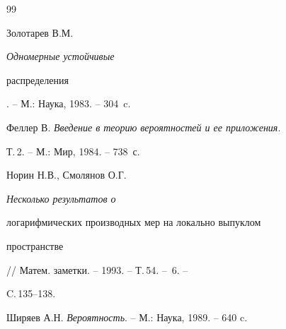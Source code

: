 \begin{thebibliography}{99}


Золотарев В.М. {\it Одномерные устойчивые 


распределения}. -- М.: Наука, 1983. -- 304~c.




Феллер В. {\it Введение в теорию вероятностей и ее приложения}.


Т.\,2. -- М.: Мир, 1984. -- 738~с.




Норин Н.В., Смолянов О.Г. {\it Несколько результатов о


логарифмических производных мер на локально выпуклом


пространстве} // Матем. заметки. -- 1993. -- Т.\,54. -- \No\,6. --


C.\,135--138.




Ширяев А.Н. {\it Вероятность}. -- М.: Наука, 1989. -- 640 c.





\end{thebibliography}





\vskip 2cm














\label{end}





